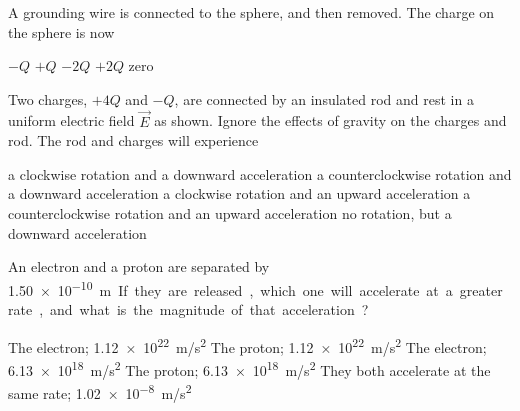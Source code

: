 \documentclass{../../oss-apphys-exam}
\begin{document}
\begin{multicols*}{2}
\begin{questions}
    \question A grounding wire is connected to the sphere, and then removed. The
    charge on the sphere is now
    \begin{choices}
      \choice $-Q$
      \choice $+Q$
      \choice $-2Q$
      \choice $+2Q$
      \choice zero
    \end{choices}
    \label{cond2}
    \columnbreak
    
    \question Two charges, $+4Q$ and $-Q$, are connected by an insulated rod and
    rest in a uniform electric field $\vec E$ as shown. Ignore the effects of
    gravity on the charges and rod. The rod and charges will experience
    \begin{choices}
      \choice a clockwise rotation and a downward acceleration
      \choice a counterclockwise rotation and a downward acceleration
      \choice a clockwise rotation and an upward acceleration
      \choice a counterclockwise rotation and an upward acceleration
      \choice no rotation, but a downward acceleration
    \end{choices}
  
    \question An electron and a proton are separated by \SI{1.50e-10}\metre. If
    they are released, which one will accelerate at a greater rate, and what is
    the magnitude of that acceleration?
    \begin{choices}
      \choice The electron; \SI{1.12e22}{m/s^2}
      \choice The proton; \SI{1.12e22}{m/s^2}
      \choice The electron; \SI{6.13e18}{m/s^2}
      \choice The proton; \SI{6.13e18}{m/s^2}
      \choice They both accelerate at the same rate; \SI{1.02e-8}{m/s^2}
    \end{choices}
    \columnbreak
  

\end{questions}
\end{multicols*}
\end{document}
